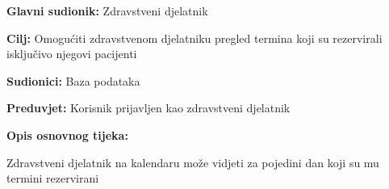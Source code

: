\noindent {}
\begin{packed_item}
	
	\item \textbf{Glavni sudionik: }Zdravstveni djelatnik
	\item  \textbf{Cilj:} Omogućiti zdravstvenom djelatniku pregled termina koji su rezervirali isključivo njegovi pacijenti
	\item  \textbf{Sudionici:} Baza podataka
	\item  \textbf{Preduvjet:} Korisnik prijavljen kao zdravstveni djelatnik
	\item  \textbf{Opis osnovnog tijeka:}
	
	\item[] \begin{packed_enum}
		
		\item Zdravstveni djelatnik na kalendaru može vidjeti za pojedini dan koji su mu termini rezervirani
	\end{packed_enum}
\end{packed_item}


